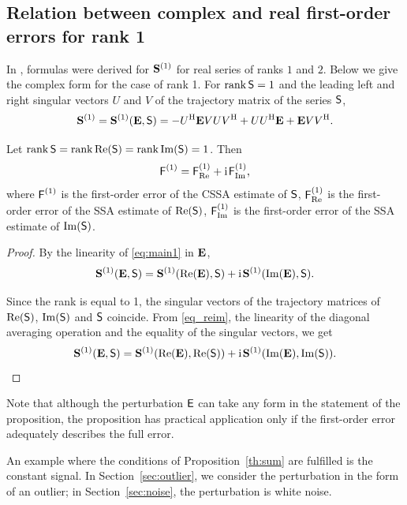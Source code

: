 \documentclass[engproc, submit, article,pdftex,moreauthors]{Definitions/mdpi}
\DeclareMathOperator\rank{rank}
\newcommand{\iu}{\mathrm{i}\mkern2mu}
\renewcommand{\Re}{\operatorname{Re}}
\renewcommand{\Im}{\operatorname{Im}}
\begin{document}
\subsection{Relation between complex and real first-order errors for rank 1}

In \cite{Nekrutkin}, formulas were derived for $\mathbf{S}^{(1)}$ for real series of ranks $1$ and $2$. Below we give the complex form for the case of rank 1.
For $\rank \tS = 1$ and the leading left and right singular vectors $U$ and $V$ of the trajectory matrix of the series $\textsf{S}$,
\begin{equation} \label{eq:main1}
	\mathbf{S}^{(1)}=\mathbf{S}^{(1)}(\mathbf{E}, \textsf{S}) = -U^{\mathrm{H}} \mathbf{E} V U V^{\mathrm{H}} + U U^{\mathrm{H}} \mathbf{E} + \mathbf{E} V V^{\mathrm{H}}.
\end{equation}


\begin{Proposition}\label{th:sum}
	Let $\rank \tS = \rank \Re(\tS) = \rank \Im(\tS) = 1$. Then $$\tF^{(1)} = \tF^{(1)}_{\Re} + \iu \tF^{(1)}_{\Im},$$
where $\textsf{F}^{(1)}$ is the first-order error of the CSSA estimate of $\textsf{S}$, $\tF^{(1)}_{\Re}$ is the first-order error of the SSA estimate of $\Re(\tS)$, $\tF^{(1)}_{\Im}$ is the first-order error of the SSA estimate of $\Im(\tS)$.
\end{Proposition}
\begin{proof}
By the linearity of \eqref{eq:main1} in $\mathbf{E}$,
\begin{equation} \label{eq_reim}
		\bfS^{(1)}(\mathbf{E}, \tS) = \bfS^{(1)}(\Re(\mathbf{E}), \tS) + \iu\bfS^{(1)}(\Im(\mathbf{E}), \tS).
\end{equation}

Since the rank is equal to 1, the singular vectors of the trajectory matrices of $\Re(\tS)$, $\Im(\tS)$ and $\textsf{S}$ coincide.
From \eqref{eq_reim}, the linearity of the diagonal averaging operation and the equality of the singular vectors, we get
\begin{equation*} 
		\bfS^{(1)}(\mathbf{E}, \tS) = \bfS^{(1)}(\Re(\mathbf{E}), \Re(\tS)) + \iu\bfS^{(1)}(\Im(\mathbf{E}), \Im(\tS)).
\end{equation*}
\end{proof}

Note that although the perturbation $\textsf{E}$ can take any form in the statement of the proposition, the proposition has practical application only if the first-order error adequately describes the full error.

An example where the conditions of Proposition~\ref{th:sum} are fulfilled is the constant signal. In Section~\ref{sec:outlier}, we consider the perturbation in the form of an outlier; in Section~\ref{sec:noise}, the perturbation is white noise.
\end{document}
